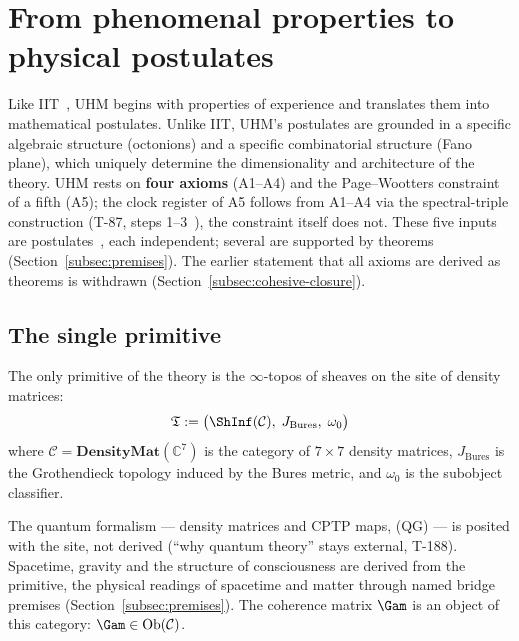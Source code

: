 
\section{From phenomenal properties to physical postulates}
\label{sec:axioms}

Like IIT~\cite{iit4}, UHM begins with properties of experience and translates them into
mathematical postulates. Unlike IIT, UHM's postulates are grounded in a specific algebraic
structure (octonions) and a specific combinatorial structure (Fano plane), which uniquely
determine the dimensionality and architecture of the theory. UHM rests on \textbf{four axioms}
(A1--A4) and the Page--Wootters constraint of a fifth (A5); the clock register of A5
follows from A1--A4 via the spectral-triple construction (T-87, steps 1--3~),
the constraint itself does not. These five inputs are postulates~, each
independent; several are supported by theorems (Section~\ref{subsec:premises}). The
earlier statement that all axioms are derived as theorems is withdrawn
(Section~\ref{subsec:cohesive-closure}).

\subsection{The single primitive}

\begin{axiombox}
The only primitive of the theory is the $\infty$-topos of sheaves on the site of density
matrices:
\begin{equation}
  \mathfrak{T} := \bigl(\ShInf(\mathcal{C}),\; J_{\mathrm{Bures}},\; \omega_0\bigr)
\end{equation}
where $\mathcal{C} = \mathbf{DensityMat}(\mathbb{C}^7)$ is the category of $7 \times 7$
density matrices, $J_{\mathrm{Bures}}$ is the Grothendieck topology induced by the Bures
metric, and $\omega_0$ is the subobject classifier.
\end{axiombox}

The quantum formalism --- density matrices and CPTP maps, (QG) --- is posited with
the site, not derived (``why quantum theory'' stays external, T-188). Spacetime,
gravity and the structure of consciousness are derived from the primitive, the
physical readings of spacetime and matter through named bridge premises
(Section~\ref{subsec:premises}). The coherence matrix $\Gam$ is an object of this category:
$\Gam \in \mathrm{Ob}(\mathcal{C})$.


